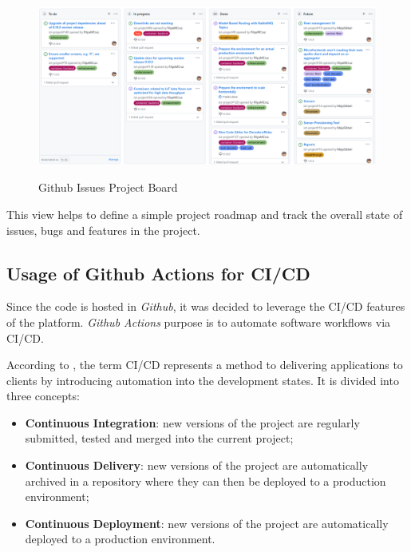 \begin{figure}[H]
    \centering
    \resizebox{\columnwidth}{!}
    {
       \includegraphics{assets/figures/github.png}
    }
    \caption[Github Issues Project Board]{Github Issues Project Board}
    \label{fig:implementation:decisions:issues:project}
\end{figure}

This view helps to define a simple project roadmap and track the overall state of issues, bugs and features in the project.

\subsection{Usage of Github Actions for CI/CD}
\label{subsec:implementation:decisions:actions}

Since the code is hosted in \textit{Github}, it was decided to leverage the CI/CD features of the platform. \textit{Github Actions} purpose is to automate software workflows via CI/CD.

According to \cite{cicd}, the term CI/CD represents a method to delivering applications to clients by introducing automation into the development states.
It is divided into three concepts:

\begin{itemize}
    \item \textbf{Continuous Integration}: new versions of the project are regularly submitted, tested and merged into the current project;
    \item \textbf{Continuous Delivery}: new versions of the project are automatically archived in a repository where they can then be deployed to a production environment;
    \item \textbf{Continuous Deployment}: new versions of the project are automatically deployed to a production environment.
\end{itemize}

